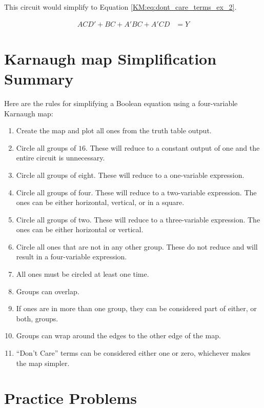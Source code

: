 This circuit would simplify to Equation \ref{KM:eq:dont_care_terms_ex_2}.

\begin{align}
  \label{KM:eq:dont_care_terms_ex_2}
  ACD'+BC+A'BC+A'CD &= Y 
\end{align}

\section{Karnaugh map Simplification Summary}
\label{KM:sec:karnaugh_map_simplification_summary}

Here are the rules for simplifying a Boolean equation using a four-variable Karnaugh map: 

\begin{enumerate}
  \item Create the map and plot all ones from the truth table output. 
  \item Circle all groups of $ 16 $. These will reduce to a constant output of one and the entire circuit is unnecessary. 
  \item Circle all groups of eight. These will reduce to a one-variable expression. 
  \item Circle all groups of four. These will reduce to a two-variable expression. The ones can be either horizontal, vertical, or in a square. 
  \item Circle all groups of two. These will reduce to a three-variable expression. The ones can be either horizontal or vertical. 
  \item Circle all ones that are not in any other group. These do not reduce and will result in a four-variable expression. 
  \item All ones must be circled at least one time. 
  \item Groups can overlap. 
  \item If ones are in more than one group, they can be considered part of either, or both, groups. 
  \item Groups can wrap around the edges to the other edge of the map.
  \item ``Don't Care'' terms can be considered either one or zero, whichever makes the map simpler. 
\end{enumerate}

\section{Practice Problems}
\label{KM:sec:practice_problems_karnaugh_maps}

